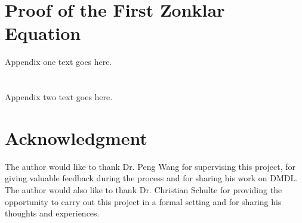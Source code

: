 \documentclass[journal,comsoc]{IEEEtran}
\begin{document}
%

    \appendices
    \section{Proof of the First Zonklar Equation}
    Appendix one text goes here.
    \section{}
    Appendix two text goes here.
\fi

\section*{Acknowledgment}
The author would like to thank Dr. Peng Wang for supervising this project, for giving valuable
feedback during the process and for sharing his work on DMDL. The author would also like to thank
Dr. Christian Schulte for providing the opportunity to carry out this project in a formal setting
and for sharing his thoughts and experiences.

\ifCLASSOPTIONcaptionsoff
  \newpage
\fi





\end{document}
